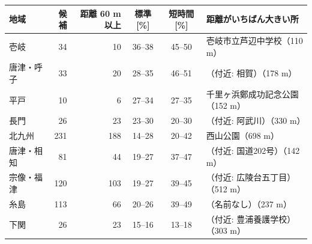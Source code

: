 \begin{tabular}{lrrccl}
\toprule
地域 & 候補 & 距離 60 m 以上 & 標準 [\%] & 短時間 [\%] & 距離がいちばん大きい所 \\
\midrule
壱岐 & 34 & 10 & 36--38 & 45--50 & 壱岐市立芦辺中学校（110 m） \\
唐津・呼子 & 33 & 20 & 28--35 & 46--51 & （付近: 相賀）（178 m） \\
平戸 & 10 & 6 & 27--34 & 27--35 & 千里ヶ浜鄭成功記念公園（152 m） \\
長門 & 26 & 23 & 23--30 & 20--30 & （付近: 阿武川）（330 m） \\
北九州 & 231 & 188 & 14--28 & 20--42 & 西山公園（698 m） \\
唐津・相知 & 81 & 44 & 19--27 & 37--47 & （付近: 国道202号）（142 m） \\
宗像・福津 & 120 & 103 & 19--27 & 39--45 & （付近: 広陵台五丁目）（512 m） \\
糸島 & 113 & 66 & 20--26 & 39--49 & （名前なし）（237 m） \\
下関 & 26 & 23 & 15--16 & 13--18 & （付近: 豊浦養護学校）（303 m） \\
\bottomrule
\end{tabular}

